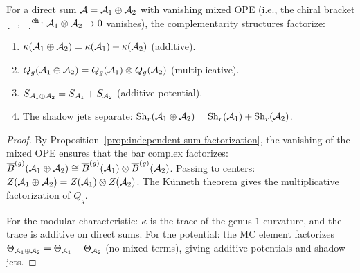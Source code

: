 \begin{proposition}
\label{prop:thqg-III-independent-sum}
For a direct sum $\mathcal{A} = \mathcal{A}_1 \oplus \mathcal{A}_2$ with vanishing
mixed OPE \textup{(}i.e., the chiral bracket
$[-,-]^{\mathrm{ch}} \colon \mathcal{A}_1 \otimes \mathcal{A}_2 \to 0$
vanishes\textup{)}, the complementarity structures factorize:
\begin{enumerate}[label=\textup{(\roman*)}]
\item $\kappa(\mathcal{A}_1 \oplus \mathcal{A}_2)
 = \kappa(\mathcal{A}_1) + \kappa(\mathcal{A}_2)$
 \textup{(}additive\textup{)}.
\item $Q_g(\mathcal{A}_1 \oplus \mathcal{A}_2)
 = Q_g(\mathcal{A}_1) \otimes Q_g(\mathcal{A}_2)$
 \textup{(}multiplicative\textup{)}.
\item $S_{\mathcal{A}_1 \oplus \mathcal{A}_2}
 = S_{\mathcal{A}_1} + S_{\mathcal{A}_2}$
 \textup{(}additive potential\textup{)}.
\item The shadow jets separate:
 $\mathrm{Sh}_r(\mathcal{A}_1 \oplus \mathcal{A}_2)
 = \mathrm{Sh}_r(\mathcal{A}_1) + \mathrm{Sh}_r(\mathcal{A}_2)$.
\end{enumerate}
\end{proposition}

\begin{proof}
By Proposition~\ref{prop:independent-sum-factorization}, the
vanishing of the mixed OPE ensures that the bar complex
factorizes: $\overline{B}^{(g)}(\mathcal{A}_1 \oplus \mathcal{A}_2)
\cong \overline{B}^{(g)}(\mathcal{A}_1) \otimes \overline{B}^{(g)}(\mathcal{A}_2)$.
Passing to centers: $Z(\mathcal{A}_1 \oplus \mathcal{A}_2) = Z(\mathcal{A}_1)
\otimes Z(\mathcal{A}_2)$. The K\"{u}nneth theorem gives the
multiplicative factorization of $Q_g$.

For the modular characteristic: $\kappa$ is the trace of the
genus-$1$ curvature, and the trace is additive on direct sums.
For the potential: the MC element factorizes
$\Theta_{\mathcal{A}_1 \oplus \mathcal{A}_2} = \Theta_{\mathcal{A}_1} + \Theta_{\mathcal{A}_2}$
(no mixed terms), giving additive potentials and shadow jets.
\end{proof}

